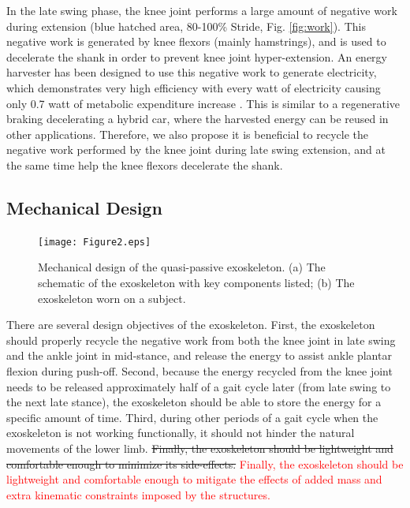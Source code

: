 \documentclass[twocolumn,cleanfoot,10pt]{asme2ej}
\begin{document}
In the late swing phase, the knee joint performs a large amount of negative work during extension (blue hatched area, 80-100\% Stride, Fig. \ref{fig:work}).
This negative work is generated by knee flexors (mainly hamstrings), and is used to decelerate the shank in order to prevent knee joint hyper-extension.
An energy harvester has been designed to use this negative work to generate electricity, which demonstrates very high efficiency with every watt of electricity causing only 0.7 watt of metabolic expenditure increase \cite{RN18}.
This is similar to a regenerative braking decelerating a hybrid car, where the harvested energy can be reused in other applications.
Therefore, we also propose it is beneficial to recycle the negative work performed by the knee joint during late swing extension, and at the same time help the knee flexors decelerate the shank.

\subsection{Mechanical Design}

\begin{figure}[b]
	\centering
	\texttt{[image: Figure2.eps]}
	\caption{Mechanical design of the quasi-passive exoskeleton.
	(a) The schematic of the exoskeleton with key components listed; (b) The exoskeleton worn on a subject.}
	\label{fig:model}   
\end{figure}

There are several design objectives of the exoskeleton.
First, the exoskeleton should properly recycle the negative work from both the knee joint in late swing and the ankle joint in mid-stance, and release the energy to assist ankle plantar flexion during push-off.
Second, because the energy recycled from the knee joint needs to be released approximately half of a gait cycle later (from late swing to the next late stance), the exoskeleton should be able to store the energy for a specific amount of time.
Third, during other periods of a gait cycle when the exoskeleton is not working functionally, it should not hinder the natural movements of the lower limb.
\sout{Finally, the exoskeleton should be lightweight and comfortable enough to minimize its side-effects.}
\textcolor{red}{Finally, the exoskeleton should be lightweight and comfortable enough to mitigate the effects of added mass and extra kinematic constraints imposed by the structures.}
\end{document}
